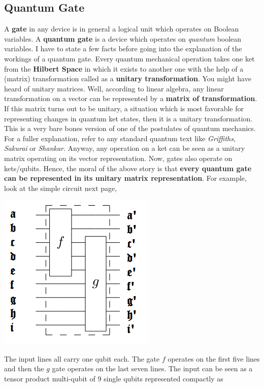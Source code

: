 \documentclass[12pt]{article}
\begin{document}
\subsection{Quantum Gate}
A \textbf{gate} in any device is in general a logical unit which operates on Boolean variables. A \textbf{quantum gate} is a device which operates on \textit{quantum} boolean variables. I have to state a few facts before going into the explanation of the workings of a quantum gate. Every quantum mechanical operation takes one ket from the \textbf{Hilbert Space} in which it exists to another one with the help of a (matrix) transformation called as a \textbf{unitary transformation}. You might have heard of unitary matrices. Well, according to linear algebra, any linear transformation on a vector can be represented by a \textbf{matrix of transformation}. If this matrix turns out to be unitary, a situation which is most favorable for representing changes in quantum ket states, then it is a unitary transformation. This is a very bare bones version of one of the postulates of quantum mechanics. For a fuller explanation, refer to any standard quantum text like \textit{Griffiths}, \textit{Sakurai} or \textit{Shankar}. Anyway, any operation on a ket can be seen as a unitary matrix operating on its vector representation. Now, gates also operate on kets/qubits. Hence, the moral of the above story is that \textbf{every quantum gate can be represented in its unitary matrix representation}. For example, look at the simple circuit next page,\\
\begin{center}
\includegraphics[scale=0.8]{qgate1.png}
\end{center}
The input lines all carry one qubit each. The gate $f$ operates on the first five lines and then the $g$ gate operates on the last seven lines. The input can be seen as a tensor product multi-qubit of 9 single qubits represented compactly as
\end{document}
